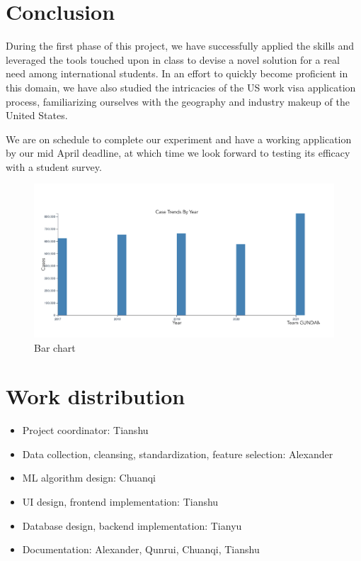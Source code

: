 \documentclass[sigconf]{acmart}
\begin{document}
\section{Conclusion}

During the first phase of this project, 
we have successfully applied the skills and leveraged the tools touched upon in class to devise a novel solution for a 
real need among international students. In an effort to quickly become proficient in this domain, we have also studied 
the intricacies of the US work visa application process, familiarizing ourselves with the geography and industry makeup 
of the United States. 

We are on schedule to complete our experiment and have a working application by our mid April deadline, at which time we 
look forward to testing its efficacy with a student survey. 


\begin{figure}
  \includegraphics[width=\linewidth]{fig3.png}
  \caption{Bar chart}
  \label{fig:barchart}
\end{figure}


\appendix

\section{Work distribution}

\begin{itemize}
	\item Project coordinator: Tianshu
	\item Data collection, cleansing, standardization, feature selection: Alexander
	\item ML algorithm design: Chuanqi 
	\item UI design, frontend implementation: Tianshu
	\item Database design, backend implementation: Tianyu
	\item Documentation: Alexander, Qunrui, Chuanqi, Tianshu
	
\end{itemize}
\end{document}

